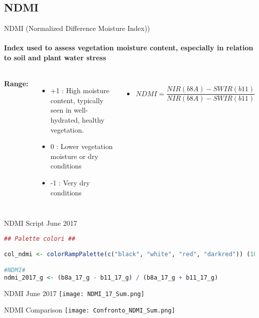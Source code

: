 \documentclass[10pt]{beamer}
\begin{document}
\subsection{NDMI}
\begin{frame}{NDMI (Normalized Difference Moisture Index))}
    \framesubtitle{Index used to assess vegetation moisture content, especially in relation to soil and plant water stress}
    \begin{columns}
            \textbf{Range:}
            \begin{itemize}
                \item +1 :  High moisture content, typically seen in well-hydrated, healthy vegetation.
                \item \hspace{0.8em}0 : Lower vegetation moisture or dry conditions
                \item \hspace{0.5em}-1 : Very dry conditions
            \end{itemize}
            \vfill %
            \begin{itemize}
                \item   \[
                        NDMI = \frac{NIR(b8A) - SWIR(b11)}{NIR(b8A) - SWIR(b11)}
                        \]
            \end{itemize}
            \vfill %
    \end{columns}
\end{frame}

\begin{frame}[fragile]{NDMI Script June 2017}
    \begin{lstlisting}[language=R]
## Palette colori ##

col_ndmi <- colorRampPalette(c("black", "white", "red", "darkred")) (100)

#NDMI#
ndmi_2017_g <- (b8a_17_g - b11_17_g) / (b8a_17_g + b11_17_g)
    \end{lstlisting}
\end{frame}

\begin{frame}{NDMI June 2017}
    \centering
    \texttt{[image: NDMI\_17\_Sum.png]}  
    
\end{frame}

\begin{frame}{NDMI Comparison}
    \centering
    \texttt{[image: Confronto\_NDMI\_Sum.png]}
\end{frame}
\end{document}
